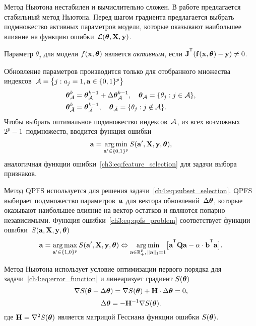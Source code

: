 \documentclass[11pt, a5paper]{dissert}
\begin{document}
Метод Ньютона нестабилен и вычислительно сложен. 
В работе предлагается стабильный метод Ньютона. 
Перед шагом градиента предлагается выбрать подмножество активных параметров модели, которые оказывают наибольшее влияние на функцию ошибки~$\mathcal{L} (\boldsymbol{\theta}, \mathbf{X}, \mathbf{y})$.
\begin{definition}
	\label{ch4:def:active_param}
	Параметр $\theta_j$ для модели $f(\mathbf{x}, \boldsymbol{\theta})$ является \textit{активным}, если $\bJ^{\T} (\mathbf{f}(\bx, \btheta) - \by) \neq 0$.
\end{definition}
Обновление параметров производится только для отобранного множества индексов~$\mathcal{A} = \bigl\{j: a_j = 1, \mathbf{a} \in \{0, 1\}^p\bigr\}$
\begin{align*}
	\boldsymbol{\theta}_{\mathcal{A}}^k &= \boldsymbol{\theta}_{\mathcal{A}}^{k - 1} + \Delta \boldsymbol{\theta}_{\mathcal{A}}^{k - 1}, \quad \boldsymbol{\theta}_{\mathcal{A}} = \{\theta_j: j \in \mathcal{A} \}, \\
	\boldsymbol{\theta}_{\bar{\mathcal{A}}}^k &= \boldsymbol{\theta}_{\bar{\mathcal{A}}}^{k - 1}, \quad \boldsymbol{\theta}_{\bar{\mathcal{A}}} = \{\theta_j: j \notin \mathcal{A} \}.
\end{align*}
Чтобы выбрать оптимальное подмножество индексов~$\mathcal{A}$, из всех возможных $2^p - 1$~подмножеств, вводится функция ошибки
\begin{equation}
	\mathbf{a} = \mathop{\arg \min}\limits_{\mathbf{a}' \in \{0, 1\}^p} S(\mathbf{a}', \mathbf{X}, \mathbf{y}, \boldsymbol{\theta}),
	\label{ch4:eq:subset_selection}
\end{equation}
аналогичная функции ошибки~\eqref{ch3:eq:feature_selection} для задачи выбора признаков. 

Метод QPFS используется для решения задачи~\eqref{ch4:eq:subset_selection}.
QPFS выбирает подмножество параметров~$\mathbf{a}$ для вектора обновлений~$ \Delta \boldsymbol{\theta}$, которые оказывают наибольшее влияние на вектор остатков и являются попарно независимыми.
Функция ошибки~\eqref{ch3:eq:qpfs_problem} соответствует функции ошибки~$S(\mathbf{a}, \mathbf{X}, \mathbf{y}, \boldsymbol{\theta})$
\begin{equation}
	\ba = \argmax_{\ba' \in \{1, 0\}^p} S(\ba', \bX, \by, \btheta) \Leftrightarrow \argmin_{\ba  \in \bbR^p_+, \, \|\ba\|_1=1} \bigl[\ba^{\T} \bQ \ba - \alpha \cdot \mathbf{b}^{\T} \ba \bigr].
\end{equation}

Метод Ньютона использует условие оптимизации первого порядка для задачи~\eqref{ch4:eq:error_function} и линеаризует градиент $S (\boldsymbol{\theta})$
\[
	\nabla S (\boldsymbol{\theta} + \Delta \boldsymbol{\theta}) = \nabla S(\boldsymbol{\theta}) + \mathbf{H} \cdot \Delta \boldsymbol{\theta} = 0,
\]
\[
	\Delta \boldsymbol{\theta} = - \mathbf{H}^{-1} \nabla S(\boldsymbol{\theta}).
\]
где $\mathbf{H} = \nabla^2 S(\boldsymbol{\theta})$ является матрицой Гессиана функции ошибки $S(\boldsymbol{\theta})$.
\end{document}
